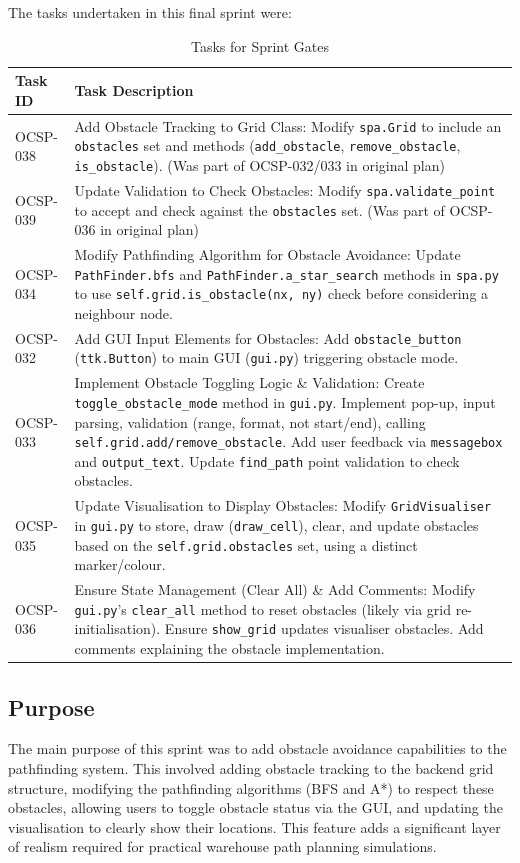 The tasks undertaken in this final sprint were:
\begin{table}[htbp]
	\centering
	\begin{tabularx}{\textwidth}{|l|X|}
		\hline
		\textbf{Task ID} & \textbf{Task Description} \\
		\hline
		OCSP-038 & Add Obstacle Tracking to Grid Class: Modify \verb|spa.Grid| to include an \verb|obstacles| set and methods (\verb|add_obstacle|, \verb|remove_obstacle|, \verb|is_obstacle|). (Was part of OCSP-032/033 in original plan) \\
		\hline
		OCSP-039 & Update Validation to Check Obstacles: Modify \verb|spa.validate_point| to accept and check against the \verb|obstacles| set. (Was part of OCSP-036 in original plan) \\
		\hline
		OCSP-034 & Modify Pathfinding Algorithm for Obstacle Avoidance: Update \verb|PathFinder.bfs| and \verb|PathFinder.a_star_search| methods in \verb|spa.py| to use \verb|self.grid.is_obstacle(nx, ny)| check before considering a neighbour node. \\
		\hline
		OCSP-032 & Add GUI Input Elements for Obstacles: Add \verb|obstacle_button| (\verb|ttk.Button|) to main GUI (\verb|gui.py|) triggering obstacle mode. \\
		\hline
		OCSP-033 & Implement Obstacle Toggling Logic \& Validation: Create \verb|toggle_obstacle_mode| method in \verb|gui.py|. Implement pop-up, input parsing, validation (range, format, not start/end), calling \verb|self.grid.add/remove_obstacle|. Add user feedback via \verb|messagebox| and \verb|output_text|. Update \verb|find_path| point validation to check obstacles. \\
		\hline
		OCSP-035 & Update Visualisation to Display Obstacles: Modify \verb|GridVisualiser| in \verb|gui.py| to store, draw (\verb|draw_cell|), clear, and update obstacles based on the \verb|self.grid.obstacles| set, using a distinct marker/colour. \\
		\hline
		OCSP-036 & Ensure State Management (Clear All) \& Add Comments: Modify \verb|gui.py|'s \verb|clear_all| method to reset obstacles (likely via grid re-initialisation). Ensure \verb|show_grid| updates visualiser obstacles. Add comments explaining the obstacle implementation. \\
		\hline
	\end{tabularx}
	\caption{Tasks for Sprint Gates}
\end{table}

\subsection{Purpose}
The main purpose of this sprint was to add obstacle avoidance capabilities to the pathfinding system. This involved adding obstacle tracking to the backend grid structure, modifying the pathfinding algorithms (BFS and A*) to respect these obstacles, allowing users to toggle obstacle status via the GUI, and updating the visualisation to clearly show their locations. This feature adds a significant layer of realism required for practical warehouse path planning simulations.

